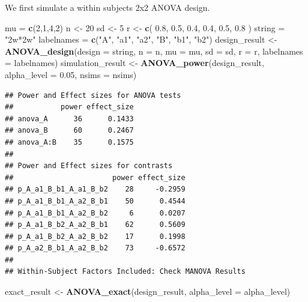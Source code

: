 \documentclass[]{book}
\newenvironment{Shaded}{\begin{snugshade}}{\end{snugshade}}
\newcommand{\DataTypeTok}[1]{\textcolor[rgb]{0.13,0.29,0.53}{#1}}
\newcommand{\DecValTok}[1]{\textcolor[rgb]{0.00,0.00,0.81}{#1}}
\newcommand{\FloatTok}[1]{\textcolor[rgb]{0.00,0.00,0.81}{#1}}
\newcommand{\KeywordTok}[1]{\textcolor[rgb]{0.13,0.29,0.53}{\textbf{#1}}}
\newcommand{\NormalTok}[1]{#1}
\newcommand{\StringTok}[1]{\textcolor[rgb]{0.31,0.60,0.02}{#1}}
\begin{document}
We first simulate a within subjects 2x2 ANOVA design.

\begin{Shaded}
\begin{Highlighting}[]
\NormalTok{mu =}\StringTok{ }\KeywordTok{c}\NormalTok{(}\DecValTok{2}\NormalTok{,}\DecValTok{1}\NormalTok{,}\DecValTok{4}\NormalTok{,}\DecValTok{2}\NormalTok{) }
\NormalTok{n <-}\StringTok{ }\DecValTok{20}
\NormalTok{sd <-}\StringTok{ }\DecValTok{5}
\NormalTok{r <-}\StringTok{ }\KeywordTok{c}\NormalTok{(}
  \FloatTok{0.8}\NormalTok{, }\FloatTok{0.5}\NormalTok{, }\FloatTok{0.4}\NormalTok{,}
       \FloatTok{0.4}\NormalTok{, }\FloatTok{0.5}\NormalTok{,}
            \FloatTok{0.8}
\NormalTok{  )}
\NormalTok{string =}\StringTok{ "2w*2w"}
\NormalTok{labelnames =}\StringTok{ }\KeywordTok{c}\NormalTok{(}\StringTok{"A"}\NormalTok{, }\StringTok{"a1"}\NormalTok{, }\StringTok{"a2"}\NormalTok{, }\StringTok{"B"}\NormalTok{, }\StringTok{"b1"}\NormalTok{, }\StringTok{"b2"}\NormalTok{)}
\NormalTok{design_result <-}\StringTok{ }\KeywordTok{ANOVA_design}\NormalTok{(}\DataTypeTok{design =}\NormalTok{ string,}
                              \DataTypeTok{n =}\NormalTok{ n, }
                              \DataTypeTok{mu =}\NormalTok{ mu, }
                              \DataTypeTok{sd =}\NormalTok{ sd, }
                              \DataTypeTok{r =}\NormalTok{ r, }
                              \DataTypeTok{labelnames =}\NormalTok{ labelnames)}
\NormalTok{simulation_result <-}\StringTok{ }\KeywordTok{ANOVA_power}\NormalTok{(design_result, }\DataTypeTok{alpha_level =} \FloatTok{0.05}\NormalTok{, }\DataTypeTok{nsims =}\NormalTok{ nsims)}
\end{Highlighting}
\end{Shaded}

\begin{verbatim}
## Power and Effect sizes for ANOVA tests
##           power effect_size
## anova_A      36      0.1433
## anova_B      60      0.2467
## anova_A:B    35      0.1575
## 
## Power and Effect sizes for contrasts
##                       power effect_size
## p_A_a1_B_b1_A_a1_B_b2    28     -0.2959
## p_A_a1_B_b1_A_a2_B_b1    50      0.4544
## p_A_a1_B_b1_A_a2_B_b2     6      0.0207
## p_A_a1_B_b2_A_a2_B_b1    62      0.5609
## p_A_a1_B_b2_A_a2_B_b2    17      0.1998
## p_A_a2_B_b1_A_a2_B_b2    73     -0.6572
## 
## Within-Subject Factors Included: Check MANOVA Results
\end{verbatim}

\begin{Shaded}
\begin{Highlighting}[]
\NormalTok{exact_result <-}\StringTok{ }\KeywordTok{ANOVA_exact}\NormalTok{(design_result, }\DataTypeTok{alpha_level =}\NormalTok{ alpha_level)}
\end{Highlighting}
\end{Shaded}
\end{document}
